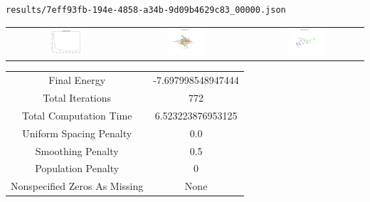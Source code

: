 \documentclass{report}
\begin{document}
\small

\begin{lstlisting}
results/7eff93fb-194e-4858-a34b-9d09b4629c83_00000.json
\end{lstlisting}
\begin{tabular}{ccc}
\includegraphics[width=0.32\textwidth]{7eff93fb-194e-4858-a34b-9d09b4629c83_00000_energies.png}
&
\includegraphics[width=0.32\textwidth]{7eff93fb-194e-4858-a34b-9d09b4629c83_00000_initial_curves.png}
&
\includegraphics[width=0.32\textwidth]{7eff93fb-194e-4858-a34b-9d09b4629c83_00000_estimated_curves.png}
\\
\end{tabular}
\begin{tabular}{cc}
Final Energy&-7.697998548947444\\
Total Iterations&772\\
Total Computation Time&6.523223876953125\\
Uniform Spacing Penalty&0.0\\
Smoothing Penalty&0.5\\
Population Penalty&0\\
Nonspecified Zeros As Missing&None\\
\end{tabular}
\end{document}
